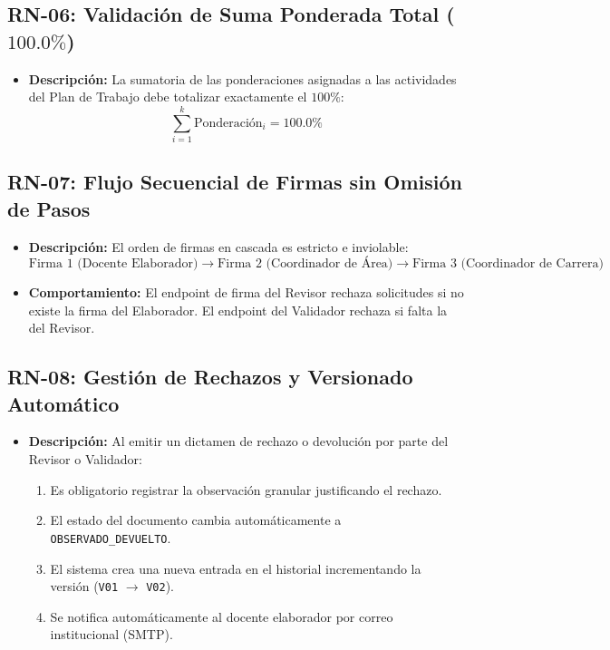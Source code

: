\documentclass[12pt,a4paper]{article}
\begin{document}
\subsection{RN-06: Validación de Suma Ponderada Total ($100.0\%$)}
\begin{itemize}[leftmargin=1.5em, itemsep=1.5pt]
    \item \textbf{Descripción:} La sumatoria de las ponderaciones asignadas a las actividades del Plan de Trabajo debe totalizar exactamente el $100\%$:
    \[
    \sum_{i=1}^{k} \text{Ponderación}_i = 100.0\%
    \]
\end{itemize}

\subsection{RN-07: Flujo Secuencial de Firmas sin Omisión de Pasos}
\begin{itemize}[leftmargin=1.5em, itemsep=1.5pt]
    \item \textbf{Descripción:} El orden de firmas en cascada es estricto e inviolable:
    \[
    \text{Firma 1 (Docente Elaborador)} \longrightarrow \text{Firma 2 (Coordinador de Área)} \longrightarrow \text{Firma 3 (Coordinador de Carrera)}
    \]
    \item \textbf{Comportamiento:} El endpoint de firma del Revisor rechaza solicitudes si no existe la firma del Elaborador. El endpoint del Validador rechaza si falta la del Revisor.
\end{itemize}

\subsection{RN-08: Gestión de Rechazos y Versionado Automático}
\begin{itemize}[leftmargin=1.5em, itemsep=1.5pt]
    \item \textbf{Descripción:} Al emitir un dictamen de rechazo o devolución por parte del Revisor o Validador:
    \begin{enumerate}[leftmargin=1.5em, itemsep=1pt]
        \item Es obligatorio registrar la observación granular justificando el rechazo.
        \item El estado del documento cambia automáticamente a \texttt{OBSERVADO\_DEVUELTO}.
        \item El sistema crea una nueva entrada en el historial incrementando la versión (\texttt{V01} $\rightarrow$ \texttt{V02}).
        \item Se notifica automáticamente al docente elaborador por correo institucional (SMTP).
    \end{enumerate}
\end{itemize}
\end{document}
